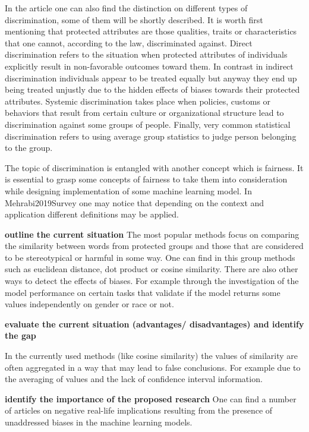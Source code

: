\documentclass[]{book}
\begin{document}
In the article one can also find the distinction on different types of
discrimination, some of them will be shortly described. It is worth
first mentioning that protected attributes are those qualities, traits
or characteristics that one cannot, according to the law, discriminated
against. Direct discrimination refers to the situation when protected
attributes of individuals explicitly result in non-favorable outcomes
toward them. In contrast in indirect discrimination individuals appear
to be treated equally but anyway they end up being treated unjustly due
to the hidden effects of biases towards their protected attributes.
Systemic discrimination takes place when policies, customs or behaviors
that result from certain culture or organizational structure lead to
discrimination against some groups of people. Finally, very common
statistical discrimination refers to using average group statistics to
judge person belonging to the group.

The topic of discrimination is entangled with another concept which is
fairness. It is essential to grasp some concepts of fairness to take
them into consideration while designing implementation of some machine
learning model. In Mehrabi2019Survey one may notice that depending on
the context and application different definitions may be applied.
\newline

\textbf{outline the current situation} The most popular methods focus on
comparing the similarity between words from protected groups and those
that are considered to be stereotypical or harmful in some way. One can
find in this group methods such as euclidean distance, dot product or
cosine similarity. There are also other ways to detect the effects of
biases. For example through the investigation of the model performance
on certain tasks that validate if the model returns some values
independently on gender or race or not. \newline

\textbf{evaluate the current situation (advantages/ disadvantages) and identify the gap}

In the currently used methods (like cosine similarity) the values of
similarity are often aggregated in a way that may lead to false
conclusions. For example due to the averaging of values and the lack of
confidence interval information. \newline

\textbf{identify the importance of the proposed research} One can find a
number of articles on negative real-life implications resulting from the
presence of unaddressed biases in the machine learning models. \newline
\end{document}
